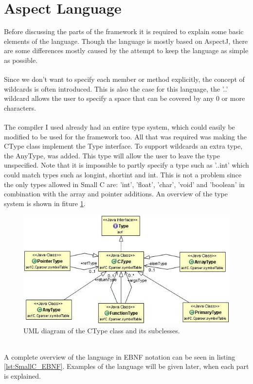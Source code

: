 \documentclass[a4paper]{report}
\begin{document}
\section{Aspect Language}
Before discussing the parts of the framework it is required to explain some basic elements of the language. Though the language is mostly based on AspectJ, there are some differences mostly caused by the attempt to keep the language as simple as possible.\\
\\
Since we don't want to specify each member or method explicitly, the concept of wildcards is often introduced. This is also the case for this language, the '..' wildcard allows the user to specify a space that can be covered by any 0 or more characters.\\
\\
The compiler I used already had an entire type system, which could easily be modified to be used for the framework too. All that was required was making the CType class implement the Type interface. To support wildcards an extra type, the AnyType, was added. This type will allow the user to leave the type unspecified. Note that it is impossible to partly specify a type such as '..int' which could match types such as longint, shortint and int. This is not a problem since the only types allowed in Small C are: 'int', 'float', 'char', 'void' and 'boolean' in combination with the array and pointer additions. An overview of the type system is shown in fiture \ref{fig:CType}.\\
\begin{figure}
\centering
\includegraphics[scale=0.7]{images/AOFC/CType.jpg}
\caption{UML diagram of the CType class and its subclesses.}
\label{fig:CType}
\end{figure}
\\
A complete overview of the language in EBNF notation can be seen in listing \ref{lst:SmallC_EBNF}. Examples of the language will be given later, when each part is explained.\\
\end{document}
